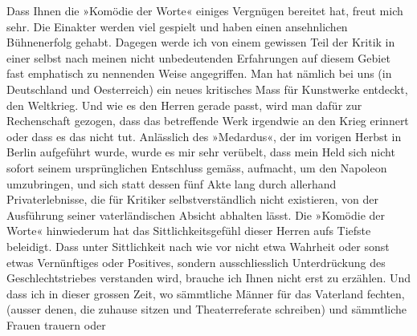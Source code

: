 \pstart
           {\pb}Dass Ihnen die »Komödie der Worte« einiges Vergnügen bereitet hat, freut mich sehr. Die
               Einakter werden viel gespielt und haben einen ansehnlichen Bühnenerfolg gehabt.
               Dagegen werde ich von einem gewissen Teil der Kritik in einer selbst nach meinen
               nicht unbedeutenden Erfahrungen auf diesem Gebiet fast emphatisch zu nennenden Weise
               angegriffen. Man hat nämlich bei uns (in Deutschland und Oesterreich) ein neues
               kritisches Mass für Kunstwerke entdeckt,  den
               Weltkrieg. Und wie es den Herren gerade passt, wird man dafür zur Rechenschaft
               gezogen, dass das betreffende Werk irgendwie an den Krieg erinnert oder dass es das
               nicht tut. Anlässlich des »Medardus«, der im
               vorigen Herbst in Berlin aufgeführt wurde, wurde
               es mir sehr verübelt, dass mein Held sich nicht sofort seinem ursprünglichen
               Entschluss gemäss, aufmacht, um den Napoleon
               umzubringen, und sich statt dessen fünf Akte lang durch allerhand Privaterlebnisse,
               die für Kritiker selbstverständlich {\pb}nicht
               existieren, von der Ausführung seiner vaterländischen Absicht abhalten lässt. Die
                  »Komödie der Worte« hinwiederum hat das
               Sittlichkeitsgefühl dieser Herren aufs Tiefste beleidigt. Dass unter Sittlichkeit
               nach wie vor nicht etwa Wahrheit oder sonst etwas Vernünftiges oder Positives,
               sondern ausschliesslich Unterdrückung des Geschlechtstrieb\introOben{}e\introOben{}s
               verstanden wird, brauche ich Ihnen nicht erst zu erzählen. Und dass ich in dieser
               grossen Zeit, wo sämmtliche Männer für das Vaterland fechten, (ausser denen, die
               zuhause sitzen und Theaterreferate schreiben) und sämmtliche Frauen trauern oder
